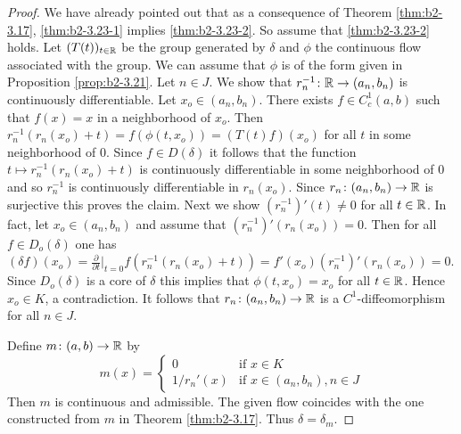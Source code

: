 \begin{proof}
We have already pointed out that as a consequence of Theorem \ref{thm:b2-3.17}, \ref{thm:b2-3.23-1} implies \ref{thm:b2-3.23-2}.
So assume that \ref{thm:b2-3.23-2} holds.
Let $(T(t))_{t \in \mathbb{R}}$ be the group generated by $\delta$ and $\phi$ the continuous flow associated with the group.
We can assume that $\phi$ is of the form given in Proposition \ref{prop:b2-3.21}.
Let $n \in J$.
We show that $r_{n}^{-1} \colon \mathbb{R} \to (a_{n},b_{n})$ is continuously differentiable.
Let $x_{o} \in (a_{n},b_{n})$.
There exists $f \in C_{c}^{1}(a,b)$ such that $f(x) = x$ in a neighborhood of $x_{o}$.
Then $r_{n}^{-1}(r_{n}(x_{o}) + t) = f(\phi(t,x_{o})) = (T(t)f)(x_{o})$ for all $t$ in some neighborhood of $0$.
Since $f \in D(\delta)$ it follows that the function $t \mapsto r_{n}^{-1}(r_{n}(x_{o}) + t)$ is continuously differentiable in some neighborhood of $0$ and so $r_{n}^{-1}$ is continuously differentiable in $r_{n}(x_{o})$.
Since $r_{n} \colon (a_{n},b_{n}) \to \mathbb{R}$ is surjective this proves the claim.
Next we show $(r_{n}^{-1})'(t) \neq 0$ for all $t \in \mathbb{R}$.
In fact, let $x_{o} \in (a_{n},b_{n})$ and assume that $(r_{n}^{-1})'(r_{n}(x_{o})) = 0$.
Then for all $f \in D_{o}(\delta)$ one has $(\delta f)(x_{o}) = \frac{\partial}{\partial t}|_{t=0} f(r_{n}^{-1}(r_{n}(x_{o}) + t)) = f'(x_{o})(r_{n}^{-1})'(r_{n}(x_{o})) = 0$.
Since $D_{o}(\delta)$ is a core of $\delta$ this implies that $\phi(t,x_{o}) = x_{o}$ for all $t \in \mathbb{R}$.
Hence $x_{o} \in K$, a contradiction.
It follows that $r_{n} \colon (a_{n},b_{n}) \to \mathbb{R}$ is a $C^{1}$-diffeomorphism for all $n \in J$.

Define $m \colon (a,b) \to \mathbb{R}$ by
\begin{equation*}\label{eq:b2-m-def}
m(x) = \begin{cases}
    0 & \text{if } x \in K \\
    1/r_{n}'(x) & \text{if } x \in (a_{n},b_{n}), n \in J
\end{cases}
\end{equation*}
Then $m$ is continuous and admissible.
The given flow coincides with the one constructed from $m$ in Theorem \ref{thm:b2-3.17}.
Thus $\delta = \delta_{m}$.
\end{proof}


